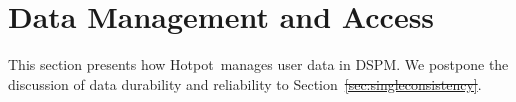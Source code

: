\documentclass[sigconf]{acmart}
\newcommand{\DIFdelFL}[1]{}
\renewcommand{\em}{\it}
\newcommand{\mycaption}[3]{\caption{\label{#1}{\bf #2} \em\small #3}}
\newcommand{\dsnvm}{DSPM}
\newcommand{\hotpot}{Hotpot}
\newcommand{\on}{ON}
\newcommand{\dirty}{dirty}
\newcommand{\committed}{committed}
\newcommand{\redundant}{redundant}
\providecommand{\DIFadd}[1]{{\protect\color{blue}\uwave{#1}}} %
\providecommand{\DIFdel}[1]{{\protect\color{red}\sout{#1}}}                      %
\providecommand{\DIFaddbegin}{} %
\providecommand{\DIFaddend}{} %
\providecommand{\DIFdelbegin}{} %
\providecommand{\DIFdelend}{} %
\providecommand{\DIFdelFL}[1]{\DIFdel{#1}} %
\begin{document}
{%
\DIFdelend \DIFaddbegin \section{Data Management and Access}
\DIFaddend \label{sec:data}
\DIFdelbegin %
\DIFdelend \DIFaddbegin 

\DIFaddend This section presents how \hotpot\ manages user data in \dsnvm. 
We postpone the discussion of data durability and reliability to Section~\DIFdelbegin \DIFdel{\ref{sec:singleconsistency}}\DIFdelend \DIFaddbegin \DIFadd{\ref{sec:xact}}\DIFaddend .

\DIFdelbegin %
\DIFdelFL{White, black, and striped blocks represent \committed, \redundant, and \dirty\ states.
Before commit, Node 2 and Node 3 both have cached copies of 
data page $B$. Node 2 has written to $B$ and created a \dirty\ page, $B1$.
During commit, Node 2 pushes the content $B1$ to its \on, Node 1.
Node 1 updates its \committed\ copy to $B1$ and also sends this update to Node 3.
Figure (c) shows the state after migrating the \on\ of chunk 1 from Node 1 to Node 3. 
After migration, Node 3 has all the pages of the chunk and all of them are in \committed\ states.
}%

}
\end{document}
